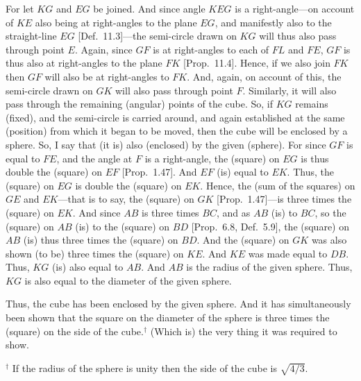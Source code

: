 \begin{Parallel}{}{}
{For let $KG$ and $EG$ be joined. And since
angle $KEG$ is a right-angle---on account of $KE$ also being at right-angles
to the plane $EG$, and manifestly also to the straight-line $EG$ [Def.~11.3]---the semi-circle drawn on $KG$ will thus also pass through
point $E$. Again, since $GF$ is at right-angles to each of $FL$
and $FE$, $GF$ is thus also at right-angles to the plane $FK$ [Prop.~11.4]. 
Hence, if we also join $FK$ then $GF$ will also be at right-angles to
$FK$. And, again, on account of this, the semi-circle drawn on
$GK$ will also pass through point $F$. Similarly, it will also pass through
the remaining (angular) points of the cube. So, if $KG$ remains (fixed), 
and the semi-circle is carried around, and again established at the
same (position) from which it began to be moved, then the cube will
be enclosed by a sphere. So, I say that (it is) also (enclosed)
by the given (sphere). For since $GF$ is equal to $FE$, and the
angle at $F$ is a right-angle, the (square) on $EG$ is thus double
the (square) on $EF$ [Prop.~1.47]. And $EF$ (is) equal to
$EK$. Thus, the (square) on $EG$ is double the (square) on $EK$.
Hence, the (sum of the squares) on $GE$ and $EK$---that is to say, the
(square) on $GK$ [Prop.~1.47]---is three times the  (square) on $EK$. And since
$AB$ is three times $BC$, and as $AB$ (is) to $BC$, so the
(square) on $AB$ (is) to the (square) on $BD$ [Prop.~6.8, Def.~5.9], 
the (square) on $AB$ (is) thus three times the (square) on $BD$. 
And the (square) on $GK$ was also shown (to be) three times
the (square) on $KE$. And $KE$ was made equal to $DB$. 
Thus, $KG$ (is) also equal to $AB$. And $AB$ is the
radius of the given sphere. Thus, $KG$ is also equal to the diameter of the
given sphere.

Thus, the cube has been enclosed by the given sphere. And it
has simultaneously been shown that the square on the diameter of
the sphere is three times the (square) on the side of the cube.$^\dag$ (Which is)
the very thing it was required to show.}
\end{Parallel}
{\footnotesize\noindent$^\dag$ If the radius of the sphere is unity 
then the side of the cube is $\sqrt{4/3}$.}

